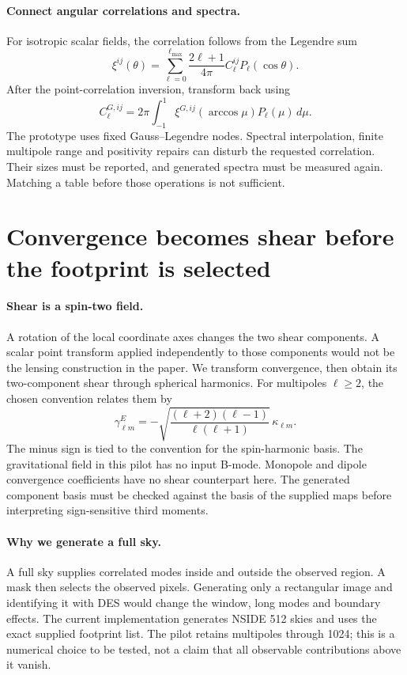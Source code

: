 \documentclass[11pt]{article}
\begin{document}
\paragraph{Connect angular correlations and spectra.}
For isotropic scalar fields, the correlation follows from the Legendre sum
\begin{equation}
 \xi^{ij}(\theta)=\sum_{\ell=0}^{\ell_{\max}}
       \frac{2\ell+1}{4\pi}C^{ij}_\ell P_\ell(\cos\theta).
\end{equation}
After the point-correlation inversion, transform back using
\begin{equation}
 C^{G,ij}_\ell=2\pi\int_{-1}^{1}
      \xi^{G,ij}(\arccos\mu)P_\ell(\mu)\,d\mu.
\end{equation}
The prototype uses fixed Gauss--Legendre nodes. Spectral interpolation,
finite multipole range and positivity repairs can disturb the requested
correlation. Their sizes must be reported, and generated spectra must be
measured again. Matching a table before those operations is not sufficient.

\section{Convergence becomes shear before the footprint is selected}
\paragraph{Shear is a spin-two field.}
A rotation of the local coordinate axes changes the two shear components.
A scalar point transform applied independently to those components would
not be the lensing construction in the paper. We transform convergence,
then obtain its two-component shear through spherical harmonics.
For multipoles $\ell\geq2$, the chosen convention relates them by
\begin{equation}
 \gamma^E_{\ell m}=
 -\sqrt{\frac{(\ell+2)(\ell-1)}{\ell(\ell+1)}}\,
 \kappa_{\ell m}.
\end{equation}
The minus sign is tied to the convention for the spin-harmonic basis.
The gravitational field in this pilot has no input B-mode. Monopole and
dipole convergence coefficients have no shear counterpart here.
The generated component basis must be checked against the basis of the
supplied maps before interpreting sign-sensitive third moments.

\paragraph{Why we generate a full sky.}
A full sky supplies correlated modes inside and outside the observed
region. A mask then selects the observed pixels. Generating only a
rectangular image and identifying it with DES would change the window,
long modes and boundary effects. The current implementation generates
NSIDE 512 skies and uses the exact supplied footprint list. The pilot
retains multipoles through 1024; this is a numerical choice to be tested,
not a claim that all observable contributions above it vanish.
\end{document}
